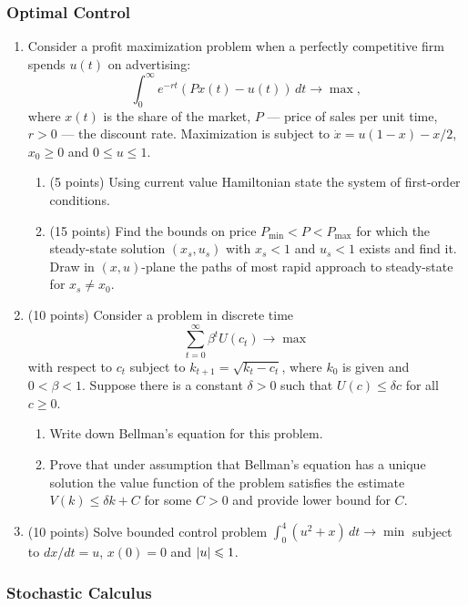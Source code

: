 \documentclass[12pt, a4paper]{article}
\DeclarePairedDelimiter{\abs}{\lvert}{\rvert}
\begin{document}
\subsubsection*{Optimal Control}

\begin{enumerate}
  \item Consider a profit maximization problem when a perfectly competitive firm spends $u(t)$ on advertising:
  \[
  \int_0^{\infty} e^{-rt} (Px(t) - u(t)) \, dt \to \max,   
  \]
where $x(t)$ is the share of the market, $P$ — price of sales per unit time, $r > 0$ — the discount rate. 
  Maximization is subject to $\dot x = u(1-x) - x/2$, $x_0\geq 0$ and $0 \leq u \leq 1$. 
  \begin{enumerate}
    \item {(5 points)} Using current value Hamiltonian state the system of first-order conditions.  
    \item {(15 points)} Find the bounds on price $P_{\min} < P < P_{\max}$ 
    for which the steady-state solution $(x_s, u_s)$ with $x_s < 1$ and $u_s<1$ exists and find it. 
    Draw in $(x,u)$-plane the paths of most rapid approach to steady-state for $x_s \neq x_0$.
  \end{enumerate}

\item {(10 points)} Consider a problem in discrete time 
\[
  \sum_{t=0}^{\infty} \beta^t U(c_t) \to \max
\] 
with respect to  $c_t$
subject to $k_{t+1} = \sqrt{k_t - c_t}$, 
where $k_0$ is given and $0 < \beta < 1$. 
Suppose there is a constant $\delta > 0$ such that $U(c) \leq \delta c$ for all $c\geq 0$. 
\begin{enumerate}
  \item Write down Bellman’s equation for this problem. 
  \item Prove that under assumption that Bellman’s equation has 
  a unique solution the value function of the problem satisfies the estimate $V(k) \leq \delta k + C$ 
  for some $C>0$ and provide lower bound for $C$.  
\end{enumerate}

\item {(10 points)} Solve bounded control problem $\int_0^4 (u^2 + x) \, dt \to \min$ 
subject to $dx/dt = u$, $x(0)=0$ and $\abs{u} \leq 1$.


\end{enumerate}

\subsubsection*{Stochastic Calculus}
\end{document}
